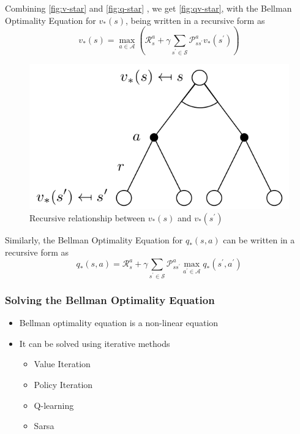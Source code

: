 Combining \autoref{fig:v-star}
 and \autoref{fig:q-star}
 , we get \autoref{fig:qv-star},
with the Bellman Optimality Equation for \(v_{*} (s)\), being written
in a recursive form as
\[
    v_{*} (s) = \max_{a \in \mathcal{A} } \left( 
        \mathcal{R} _{s}^{a} + \gamma \sum_{s^{\prime} \in \mathcal{S} } \mathcal{P} _{ss^{\prime}}^{a} v_{*} (s^{\prime} )
     \right)  
\]
\begin{figure}[H]
    \centering
    \includegraphics[width=0.5\linewidth]{figures/qv-star.png}
    \caption{Recursive relationship between \(v_{*} (s)\) and \(v_{*} (s^{\prime} )\)} 
    \label{fig:qv-star}
\end{figure}
Similarly, the Bellman Optimality Equation for \(q_{*} (s, a)\) can be written in
a recursive form as
\[
    q_{*} (s, a) = \mathcal{R} _{s}^{a} + \gamma \sum_{s^{\prime}
     \in \mathcal{S} } \mathcal{P} _{ss^{\prime}}^{a} 
     \max_{a^{\prime} \in \mathcal{A} } q_{*} (s^{\prime} , a^{\prime} )
\]

\subsubsection*{Solving the Bellman Optimality Equation}
\begin{itemize}
    \item Bellman optimality equation is a non-linear equation
    \item It can be solved using iterative methods
    \begin{itemize}
        \item Value Iteration
        \item Policy Iteration
        \item Q-learning
        \item Sarsa
    \end{itemize}
\end{itemize}